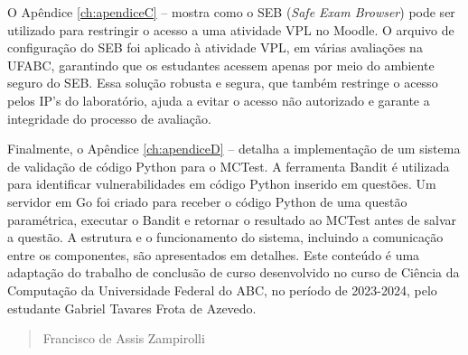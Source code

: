 O Apêndice \ref{ch:apendiceC} --  mostra como o SEB (\textit{Safe Exam Browser}) pode ser utilizado para restringir o acesso a uma atividade VPL no Moodle. O arquivo de configuração do SEB foi aplicado à atividade VPL, em várias avaliações na UFABC, garantindo que os estudantes acessem apenas por meio do ambiente seguro do SEB. Essa solução robusta e segura, que também restringe o acesso pelos IP's do laboratório, ajuda a evitar o acesso não autorizado e garante a integridade do processo de avaliação.

Finalmente, o Apêndice \ref{ch:apendiceD} --  detalha a implementação de um sistema de validação de código Python para o MCTest. A ferramenta Bandit é utilizada para identificar vulnerabilidades em código Python inserido em questões. Um servidor em Go foi criado para receber o código Python de uma questão paramétrica, executar o Bandit e retornar o resultado ao MCTest antes de salvar a questão. A estrutura e o funcionamento do sistema, incluindo a comunicação entre os componentes, são apresentados em detalhes. Este conteúdo é uma adaptação do trabalho de conclusão de curso desenvolvido no curso de Ciência da Computação da Universidade Federal do ABC, no período de 2023-2024, pelo estudante Gabriel Tavares Frota de Azevedo.

\begin{verse}
    \vspace*{2mm}
	\begin{flushright}
		Francisco de Assis Zampirolli\\
            \date{\today}
	\end{flushright}
\end{verse}
